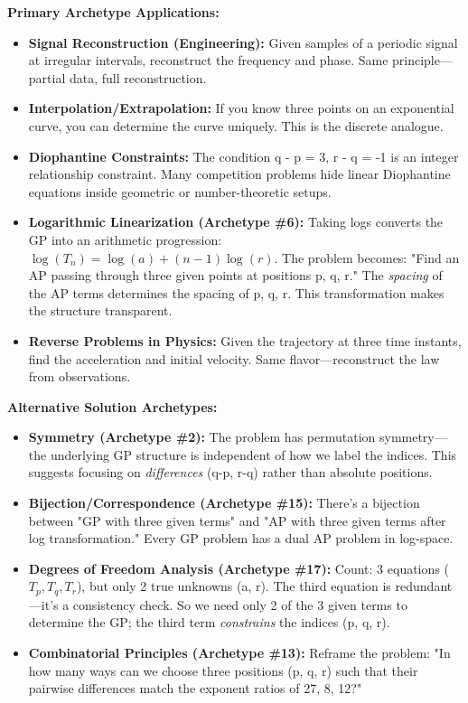 \documentclass{article}
\begin{document}
\noindent \textbf{Primary Archetype Applications:}
\begin{itemize}
    \item \textbf{Signal Reconstruction (Engineering):} Given samples of a periodic signal at irregular intervals, reconstruct the frequency and phase. Same principle—partial data, full reconstruction.
    \item \textbf{Interpolation/Extrapolation:} If you know three points on an exponential curve, you can determine the curve uniquely. This is the discrete analogue.
    \item \textbf{Diophantine Constraints:} The condition q - p = 3, r - q = -1 is an integer relationship constraint. Many competition problems hide linear Diophantine equations inside geometric or number-theoretic setups.
    \item \textbf{Logarithmic Linearization (Archetype \#6):} Taking logs converts the GP into an arithmetic progression: $\log(T_n) = \log(a) + (n-1)\log(r)$. The problem becomes: "Find an AP passing through three given points at positions p, q, r." The \textit{spacing} of the AP terms determines the spacing of p, q, r. This transformation makes the structure transparent.
    \item \textbf{Reverse Problems in Physics:} Given the trajectory at three time instants, find the acceleration and initial velocity. Same flavor—reconstruct the law from observations.
\end{itemize}

\noindent \textbf{Alternative Solution Archetypes:}
\begin{itemize}
    \item \textbf{Symmetry (Archetype \#2):} The problem has permutation symmetry—the underlying GP structure is independent of how we label the indices. This suggests focusing on \textit{differences} (q-p, r-q) rather than absolute positions.
    \item \textbf{Bijection/Correspondence (Archetype \#15):} There's a bijection between "GP with three given terms" and "AP with three given terms after log transformation." Every GP problem has a dual AP problem in log-space.
    \item \textbf{Degrees of Freedom Analysis (Archetype \#17):} Count: 3 equations ($T_p, T_q, T_r$), but only 2 true unknowns (a, r). The third equation is redundant—it's a consistency check. So we need only 2 of the 3 given terms to determine the GP; the third term \textit{constrains} the indices (p, q, r).
    \item \textbf{Combinatorial Principles (Archetype \#13):} Reframe the problem: "In how many ways can we choose three positions (p, q, r) such that their pairwise differences match the exponent ratios of 27, 8, 12?"
\end{itemize}
\end{document}
